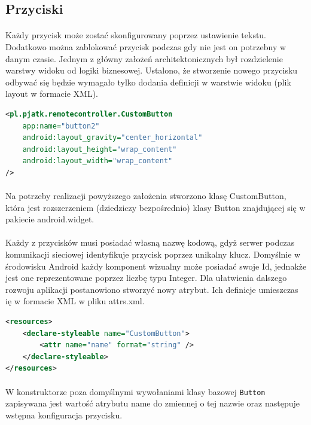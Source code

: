 \subsection{Przyciski}
\paragraph{}
Każdy przycisk może zostać skonfigurowany poprzez ustawienie tekstu. Dodatkowo można zablokować przycisk podczas gdy nie jest on potrzebny w danym czasie. 
Jednym z główny założeń architektonicznych był rozdzielenie warstwy widoku od logiki biznesowej. Ustalono, że stworzenie nowego przycisku odbywać się będzie wymagało tylko dodania definicji w warstwie widoku (plik layout w formacie XML).

\begin{lstlisting}[language=XML]
<pl.pjatk.remotecontroller.CustomButton
    app:name="button2"
    android:layout_gravity="center_horizontal"
    android:layout_height="wrap_content"
    android:layout_width="wrap_content"
/>
\end{lstlisting}
\paragraph{}
Na potrzeby realizacji powyższego założenia stworzono klasę CustomButton, która jest rozszerzeniem (dziedziczy bezpośrednio) klasy Button znajdującej się w pakiecie  android.widget.
\paragraph{}
Każdy z przycisków musi posiadać własną nazwę kodową, gdyż serwer podczas komunikacji sieciowej identyfikuje przycisk poprzez unikalny klucz. Domyślnie w środowisku Android każdy komponent wizualny może posiadać swoje Id, jednakże jest one reprezentowane poprzez liczbę typu Integer.
Dla ułatwienia dalszego rozwoju aplikacji postanowiono stworzyć nowy atrybut. Ich definicje umieszczas ię w formacie XML w pliku attrs.xml.

\begin{lstlisting}[language=XML]
<resources>
    <declare-styleable name="CustomButton">
        <attr name="name" format="string" />
    </declare-styleable>
</resources>
\end{lstlisting}

\paragraph{}
W konstruktorze poza domyślnymi wywołaniami klasy bazowej \texttt{Button} zapisywana jest wartość atrybutu name do zmiennej o tej nazwie oraz następuje wstępna konfiguracja przycisku.

